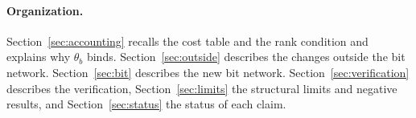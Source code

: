 \paragraph{Organization.} Section~\ref{sec:accounting} recalls the cost table and the rank condition and explains why $\theta_b$ binds. Section~\ref{sec:outside} describes the changes outside the bit network. Section~\ref{sec:bit} describes the new bit network. Section~\ref{sec:verification} describes the verification, Section~\ref{sec:limits} the structural limits and negative results, and Section~\ref{sec:status} the status of each claim.
